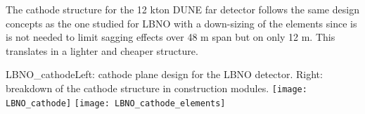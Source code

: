 The cathode structure for the 12 kton DUNE far detector follows the same design concepts as the one studied for LBNO with a down-sizing of the elements since is is not needed to limit sagging effects over 48 m span but on only 12 m. This translates in a lighter and cheaper structure. 

\begin{cdrfigure}{LBNO_cathode}{\small Left: cathode plane design for the LBNO detector. Right: breakdown of the cathode structure in construction modules.}
\texttt{[image: LBNO\_cathode]} \hfil
\texttt{[image: LBNO\_cathode\_elements]}
\end{cdrfigure}


